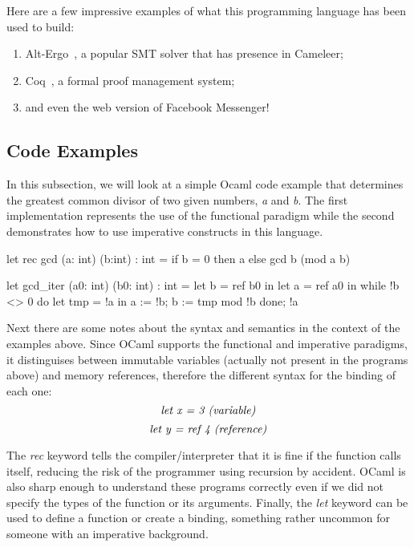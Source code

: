 Here are a few impressive examples of what this programming language has been used to build: 
\begin{enumerate}
  \item Alt-Ergo~\cite{altergo}, a popular SMT solver that has presence in Cameleer;
  \item Coq~\cite{coq}, a formal proof management system;
  \item and even the web version of Facebook Messenger!
\end{enumerate}

\subsection{Code Examples} 
\label{sub:examples_ocaml}

In this subsection, we will look at a simple Ocaml code example that determines the greatest common divisor of two given numbers, \emph{a} and \emph{b}.
The first implementation represents the use of the functional paradigm while the second demonstrates how to use imperative constructs in this language.

\begin{ocamlsmall}
  let rec gcd (a: int) (b:int) : int =
      if b = 0 then a
      else gcd b (mod a b) 
\end{ocamlsmall}

\begin{ocamlsmall}
  let gcd_iter (a0: int) (b0: int) : int =
      let b = ref b0 in
      let a = ref a0 in
      while !b <> 0 do
          let tmp = !a in
          a := !b;
          b := tmp mod !b
      done;
      !a
\end{ocamlsmall}

Next there are some notes about the syntax and semantics in the context of the examples above. 
Since OCaml supports the functional and imperative paradigms, it distinguises between immutable variables (actually not present in the programs above) and memory references, therefore the different syntax for the binding of each one: 
\[ \emph{let x = 3 (variable)} \]
\vspace{-25pt}
\[ \emph{let y = ref 4 (reference)} \]

The \emph{rec} keyword tells the compiler/interpreter that it is fine if the function calls itself, reducing the risk of the programmer using recursion by accident.
OCaml is also sharp enough to understand these programs correctly even if we did not specify the types of the function or its arguments.
Finally, the \emph{let} keyword can be used to define a function or create a binding, something rather uncommon for someone with an imperative background.



